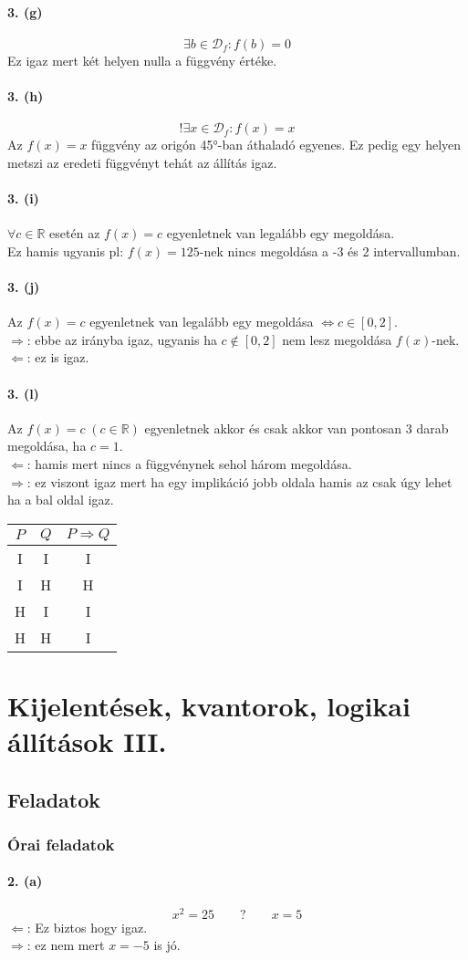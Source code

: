 \documentclass[12pt,a4paper,fleqn]{article}
\newcommand{\myparagraph}[1]{\paragraph{#1}\mbox{}}
\begin{document}
\myparagraph{3. (g)}
\[ \exists b \in \mathcal{D}_f: f(b) = 0 \]
Ez igaz mert két helyen nulla a függvény értéke.


\myparagraph{3. (h)}
\[ !\exists x \in \mathcal{D}_f: f(x) = x \]
Az $f(x) = x$ függvény az origón 45°-ban áthaladó egyenes. Ez pedig egy helyen
metszi az eredeti függvényt tehát az állítás igaz.


\myparagraph{3. (i)}
$\forall c \in \mathbb{R}$ esetén az $f(x) = c$ egyenletnek van legalább egy
megoldása. \\
Ez hamis ugyanis pl: $f(x)=125$-nek nincs megoldása a -3 és 2 intervallumban.

\myparagraph{3. (j)}
Az $f(x) = c$ egyenletnek van legalább egy megoldása $\iff c \in [0,2]$. \\
$\Rightarrow$: ebbe az irányba igaz, ugyanis ha $c \notin [0,2]$ nem lesz
megoldása $f(x)$-nek. \\
$\Leftarrow$: ez is igaz.


\myparagraph{3. (l)}
Az $f(x) = c \; (c \in \mathbb{R})$ egyenletnek akkor és csak akkor van pontosan 3
darab megoldása, ha $c = 1$. \\
$\Leftarrow$: hamis mert nincs a függvénynek sehol három megoldása. \\
$\Rightarrow$: ez viszont igaz mert ha egy implikáció jobb oldala hamis az csak
úgy lehet ha a bal oldal igaz. \\[1.3em]
\begin{tabular}{c|c|c}
  $P$ & $Q$ & $P \Rightarrow Q$ \\ \hline
  I & I & I \\ \hline
  I & H & H \\ \hline
  H & I & I \\ \hline
  H & H & I
\end{tabular}


\clearpage
\section{Kijelentések, kvantorok, logikai állítások III.}
\setcounter{subsection}{1}
\subsection{Feladatok}
\subsubsection{Órai feladatok}


\myparagraph{2. (a)}
\[ x^2 = 25 \qquad ? \qquad x = 5 \]
$\Leftarrow$: Ez biztos hogy igaz. \\
$\Rightarrow$: ez nem mert $x=-5$ is jó.
\end{document}
